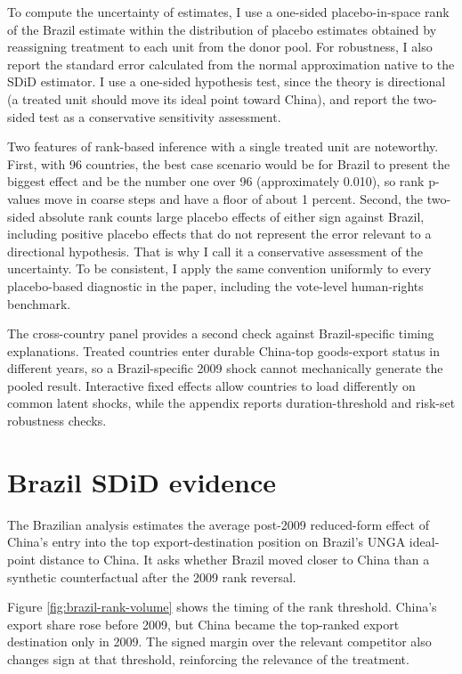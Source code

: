 \documentclass[
  12pt,
]{article}
\begin{document}
To compute the uncertainty of estimates, I use a one-sided placebo-in-space rank of the Brazil estimate within the distribution of placebo estimates obtained by reassigning treatment to each unit from the donor pool. For robustness, I also report the standard error calculated from the normal approximation native to the SDiD estimator. I use a one-sided hypothesis test, since the theory is directional (a treated unit should move its ideal point toward China), and report the two-sided test as a conservative sensitivity assessment.

Two features of rank-based inference with a single treated unit are noteworthy. First, with 96 countries, the best case scenario would be for Brazil to present the biggest effect and be the number one over 96 (approximately 0.010), so rank p-values move in coarse steps and have a floor of about 1 percent. Second, the two-sided absolute rank counts large placebo effects of either sign against Brazil, including positive placebo effects that do not represent the error relevant to a directional hypothesis. That is why I call it a conservative assessment of the uncertainty. To be consistent, I apply the same convention uniformly to every placebo-based diagnostic in the paper, including the vote-level human-rights benchmark.

The cross-country panel provides a second check against Brazil-specific timing explanations. Treated countries enter durable China-top goods-export status in different years, so a Brazil-specific 2009 shock cannot mechanically generate the pooled result. Interactive fixed effects allow countries to load differently on common latent shocks, while the appendix reports duration-threshold and risk-set robustness checks.

\section{Brazil SDiD evidence}\label{brazil-sdid-evidence}

The Brazilian analysis estimates the average post-2009 reduced-form effect of China's entry into the top export-destination position on Brazil's UNGA ideal-point distance to China. It asks whether Brazil moved closer to China than a synthetic counterfactual after the 2009 rank reversal.

Figure \ref{fig:brazil-rank-volume} shows the timing of the rank threshold. China's export share rose before 2009, but China became the top-ranked export destination only in 2009. The signed margin over the relevant competitor also changes sign at that threshold, reinforcing the relevance of the treatment.
\end{document}
